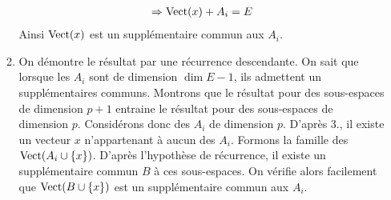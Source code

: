 \begin{enumerate}
\begin{enumerate}
\begin{align*}
\Rightarrow \operatorname{Vect}(x)+ A_i=E
\end{align*}
Ainsi $\operatorname{Vect}(x)$ est un supplémentaire commun aux $A_i$.
\item On démontre le résultat par une récurrence descendante. On sait que lorsque les $A_i$ sont de dimension $\dim E -1$, ils admettent un supplémentaires communs.\newline
Montrons que le résultat pour des sous-espaces de dimension $p+1$ entraine le résultat pour des sous-espaces de dimension $p$.\newline
Considérons donc des $A_i$ de dimension $p$. D'après 3., il existe un vecteur $x$ n'appartenant à aucun des $A_i$. Formons la famille des $\operatorname{Vect}(A_i\cup \{x\})$. D'après l'hypothèse de récurrence, il existe un supplémentaire commun $B$ à ces sous-espaces. On vérifie alors facilement que $\operatorname{Vect}(B\cup \{x\})$ est un supplémentaire commun aux $A_i$. 
\end{enumerate}
\end{enumerate}

